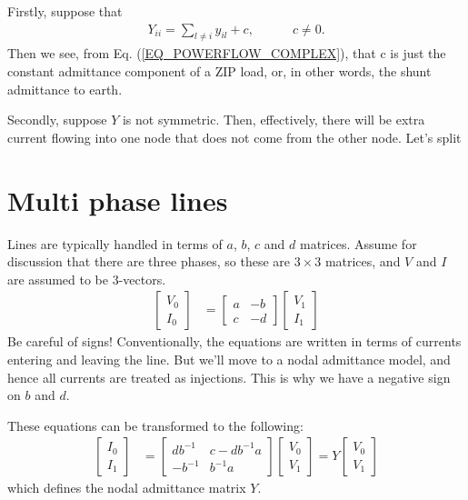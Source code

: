 \documentclass[11pt]{article}
\begin{document}
Firstly, suppose that
\begin{align}
	Y_{ii} = \sum_{l \ne i} y_{il} + c, \hspace{3em} c \ne 0.
\end{align}
Then we see, from Eq. (\ref{EQ_POWERFLOW_COMPLEX}), that c is just the constant admittance component of a ZIP load, or, in other words, the shunt admittance to earth.

Secondly, suppose $Y$ is not symmetric. Then, effectively, there will be extra current flowing into one node that does not come from the other node. Let's split 

\section{Multi phase lines}
Lines are typically handled in terms of $a$, $b$, $c$ and $d$ matrices. Assume for discussion that there are three phases, so these are $3 \times 3$ matrices, and $V$ and $I$ are assumed to be 3-vectors.
\begin{align}
	\begin{bmatrix} V_0 \\ I_0 \end{bmatrix} &=
	\begin{bmatrix} a & -b \\ c & -d \end{bmatrix} \begin{bmatrix} V_1 \\ I_1 \end{bmatrix}
\end{align}
Be careful of signs! Conventionally, the equations are written in terms of currents entering and leaving the line. But we'll move to a nodal admittance model, and hence all currents are treated as injections. This is why we have a negative sign on $b$ and $d$.

These equations can be transformed to the following:
\begin{align}
	\begin{bmatrix} I_0 \\ I_1 \end{bmatrix} &=
	\begin{bmatrix} db^{-1} & c - db^{-1}a \\ -b^{-1} & b^{-1}a \end{bmatrix} \begin{bmatrix} V_0 \\ V_1 \end{bmatrix} = Y\begin{bmatrix} V_0 \\ V_1 \end{bmatrix} 
\end{align}
which defines the nodal admittance matrix $Y$.
\end{document}
